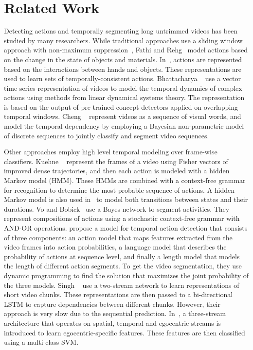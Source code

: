 \documentclass[10pt,twocolumn,letterpaper]{article}
\begin{document}
\section{Related Work}

Detecting actions and temporally segmenting long untrimmed videos has been 
studied by many researchers. While traditional approaches use a sliding window 
approach with non-maximum suppression~\cite{rohrbach2012database, karaman2014fast}, 
Fathi and Rehg~\cite{fathi2013modeling} model actions based on the change in the state 
of objects and materials. In~\cite{fathi2011understanding}, actions are represented 
based on the interactions between hands and objects. These representations are used to 
learn sets of temporally-consistent actions. Bhattacharya \etal~\cite{bhattacharya2014recognition} 
use a vector time series representation of videos to model the temporal dynamics of complex 
actions using methods from linear dynamical systems theory. The representation is based on 
the output of pre-trained concept detectors applied on overlapping temporal windows. 
Cheng \etal~\cite{cheng2014temporal} represent videos as a sequence of visual 
words, and model the temporal dependency by employing a Bayesian non-parametric model 
of discrete sequences to jointly classify and segment video sequences.

Other approaches employ high level temporal modeling over frame-wise classifiers.  
Kuehne \etal~\cite{kuehne2016end} represent the frames of a video using Fisher vectors of 
improved dense trajectories, and then each action is modeled with a hidden Markov 
model (HMM). These HMMs are combined with a context-free grammar for recognition 
to determine the most probable sequence of actions. A hidden Markov model is also 
used in~\cite{tang2012learning} to model both transitions between states and their durations.
Vo and Bobick~\cite{vo2014stochastic} use a Bayes network to segment activities. 
They represent compositions of actions using a stochastic context-free grammar with 
AND-OR operations.
\cite{richard2016temporal} propose a model for temporal action detection that 
consists of three components:  an action model that maps features extracted from 
the video frames into action probabilities, a language model that describes the 
probability of actions at sequence level, and finally a length model that models 
the length of different action segments. To get the video segmentation, they use 
dynamic programming to find the solution that maximizes the joint probability of 
the three models.
Singh \etal~\cite{singh2016multi} use a two-stream network to learn representations 
of short video chunks. These representations are then passed to a bi-directional 
LSTM to capture dependencies between different chunks. However, their approach is 
very slow due to the sequential prediction.
In~\cite{singh2016first}, a three-stream architecture that operates on spatial, 
temporal and egocentric streams is introduced to learn  egocentric-specific features. 
These features are then classified using a multi-class SVM.
\end{document}
